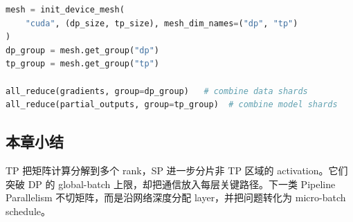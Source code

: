

\begin{lstlisting}[language=Python,caption={二维 device mesh 上选择 DP/TP process group}]
mesh = init_device_mesh(
    "cuda", (dp_size, tp_size), mesh_dim_names=("dp", "tp")
)
dp_group = mesh.get_group("dp")
tp_group = mesh.get_group("tp")

all_reduce(gradients, group=dp_group)   # combine data shards
all_reduce(partial_outputs, group=tp_group)  # combine model shards
\end{lstlisting}


\subsection{本章小结}

TP 把矩阵计算分解到多个 rank，SP 进一步分片非 TP 区域的 activation。它们突破 DP 的 global-batch 上限，却把通信放入每层关键路径。下一类 Pipeline Parallelism 不切矩阵，而是沿网络深度分配 layer，并把问题转化为 micro-batch schedule。

